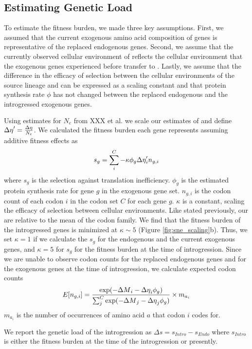 \subsection*{Estimating Genetic Load}

To estimate the fitness burden, we made three key assumptions.
First, we assumed that the current exogenous amino acid composition of genes is representative of the replaced endogenous genes.
Second, we assume that the currently observed cellular environment of \gossypii reflects the cellular environment that the exogenous genes experienced before transfer to \kluyveri.
Lastly, we assume that the difference in the efficacy of selection between the cellular environments of the source lineage and \kluyveri can be expressed as a scaling constant and that protein synthesis rate $\phi$ has not changed between the replaced endogenous and the introgressed exogenous genes.

Using estimates for $N_e$ from XXX et al. we scale our estimates of \DE and define ${\Delta \eta}' = \frac{{\Delta \eta}}{N_e}$.
We calculated the fitness burden each gene represents assuming additive fitness effects as 
\begin{equation}
s_g = \sum_i^{C} -\kappa \phi_g {\Delta \eta}'_i n_{g,i} 
\end{equation}
where $s_g$ is the selection against translation inefficiency.
$\phi_g$ is the estimated protein synthesis rate for gene $g$ in the exogenous gene set.
$n_{g,i}$ is the codon count of each codon $i$ in the codon set $C$ for each gene $g$.
$\kappa$ is a constant, scaling the efficacy of selection between cellular environments.
Like stated previously, our \DE are relative to the mean of the codon family.
We find that the fitness burden of the introgressed genes  is minimized at $\kappa \sim 5$ (Figure \ref{fig:sne_scaling}b).
Thus, we set $\kappa = 1$ if we calculate the $s_g$ for the endogenous and the current exogenous genes, and $\kappa = 5$ for $s_g$ for the fitness burden at the time of introgression.
Since we are unable to observe codon counts for the replaced endogenous genes and for the exogenous genes at the time of introgression, we calculate expected codon counts
\begin{equation}
E[n_{g,i}] = \frac{\exp(-{\Delta M}_i -{\Delta \eta}_i\phi_g)}{\sum_j^C \exp(-{\Delta M}_j -{\Delta \eta}_j\phi_g)}\times m_{a_i}
\end{equation} 
$m_{a_i}$ is the number of occurrences of amino acid $a$ that codon $i$ codes for.

We report the genetic load of the introgression as $\Delta s = s_{Intro} - s_{Endo}$ where $s_{Intro}$ is either the fitness burden at the time of the introgression or presently.

